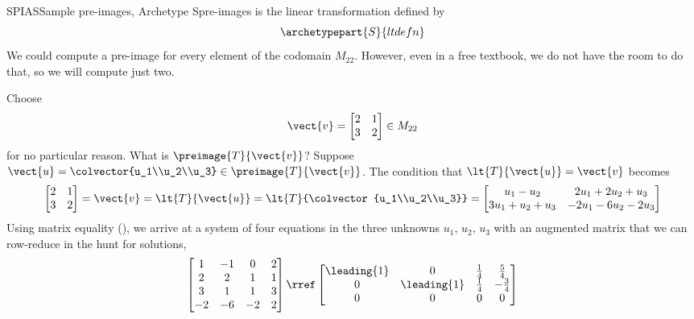 \begin{example}{SPIAS}{Sample pre-images, Archetype S}{pre-images}
 is the linear transformation defined by
%
\begin{equation*}
\archetypepart{S}{ltdefn}
\end{equation*}
%
We could compute a pre-image for every element of the codomain $M_{22}$.  However, even in a free textbook, we do not have the room to do that, so we will compute just two.\par
%
Choose 
%
\begin{equation*}
\vect{v}=
\begin{bmatrix}
2&1\\3&2
\end{bmatrix}
\in M_{22}
\end{equation*}
%
for no particular reason.  What is $\preimage{T}{\vect{v}}$?  Suppose $\vect{u}=\colvector{u_1\\u_2\\u_3}\in\preimage{T}{\vect{v}}$.  The condition that $\lt{T}{\vect{u}}=\vect{v}$ becomes
%
\begin{equation*}
\begin{bmatrix}
2&1\\3&2
\end{bmatrix}
=\vect{v}
=\lt{T}{\vect{u}}
=\lt{T}{\colvector{u_1\\u_2\\u_3}}\\
=\begin{bmatrix}
u_1-u_2&2u_1+2u_2+u_3\\
3u_1+u_2+u_3&-2u_1-6u_2-2u_3
\end{bmatrix}
\end{equation*}
%
Using matrix equality (), we arrive at a system of four equations in the three unknowns $u_1,\,u_2,\,u_3$ with an augmented matrix that we can row-reduce in the hunt for solutions,
%
\begin{equation*}
\begin{bmatrix}
1 & -1 & 0 & 2\\
2 & 2 & 1 & 1\\
3 & 1 & 1 & 3\\
-2 & -6 & -2 & 2
\end{bmatrix}
\rref
\begin{bmatrix}
\leading{1} & 0 & \frac{1}{4} &  \frac{5}{4}\\ 
0 & \leading{1} & \frac{1}{4} &  -\frac{3}{4}\\ 
0 & 0 & 0 &  0\\ 

\end{bmatrix}
\end{equation*}
\end{example}
